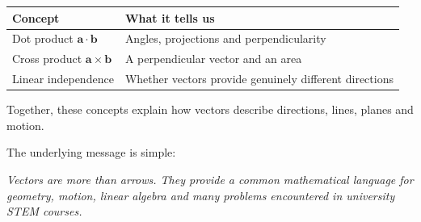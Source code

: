 \vspace{0.5em}
\begin{center}
\renewcommand{\arraystretch}{1.4}
\begin{tabular}{|p{}|p{}|}
\hline
\textbf{Concept} & \textbf{What it tells us} \\
\hline
Dot product $\mathbf{a} \cdot \mathbf{b}$
  & Angles, projections and perpendicularity \\
\hline
Cross product $\mathbf{a} \times \mathbf{b}$
  & A perpendicular vector and an area \\
\hline
Linear independence
  & Whether vectors provide genuinely different directions \\
\hline
\end{tabular}
\end{center}

\vspace{0.5em}
\noindent
Together, these concepts explain how vectors describe directions,
lines, planes and motion.

\vspace{0.4em}
\noindent
The underlying message is simple:

\begin{center}
\itshape
Vectors are more than arrows.
They provide a common mathematical language for geometry, motion,
linear algebra and many problems encountered in university STEM
courses.
\end{center}

\endgroup
